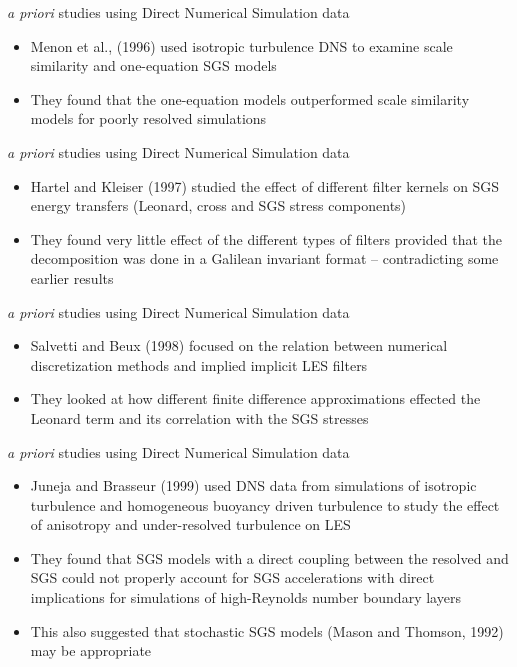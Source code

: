 
\begin{frame}{\textit{a priori} studies using Direct Numerical Simulation data}
\begin{itemize}
	\item Menon et al., (1996) used isotropic turbulence DNS to examine scale similarity and one-equation SGS models
	\item They found that the one-equation models outperformed scale similarity models for poorly resolved simulations
\end{itemize}
\end{frame}


\begin{frame}{\textit{a priori} studies using Direct Numerical Simulation data}
\begin{itemize}
	\item Hartel and Kleiser (1997) studied the effect of different filter kernels on SGS energy transfers (Leonard, cross and SGS stress components)
	\item They found very little effect of the different types of filters provided that the decomposition was done in a Galilean invariant format -- contradicting some earlier results
\end{itemize}
\end{frame}


\begin{frame}{\textit{a priori} studies using Direct Numerical Simulation data}
\begin{itemize}
	\item Salvetti and Beux (1998) focused on the relation between numerical discretization methods and implied implicit LES filters
	\item They looked at how different finite difference approximations effected the Leonard term and its correlation with the SGS stresses
\end{itemize}
\end{frame}


\begin{frame}{\textit{a priori} studies using Direct Numerical Simulation data}
\begin{itemize}
	\item Juneja and Brasseur (1999) used DNS data from simulations of isotropic turbulence and homogeneous buoyancy driven turbulence to study the effect of anisotropy and under-resolved turbulence on LES
	\item They found that SGS models with a direct coupling between the resolved and SGS could not properly account for SGS accelerations with direct implications for simulations of high-Reynolds number boundary layers
	\item This also suggested that stochastic SGS models  (Mason and Thomson, 1992) may be appropriate
\end{itemize}
\end{frame}

